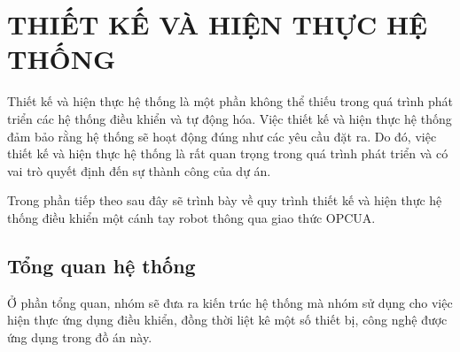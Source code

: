 \chapter{THIẾT KẾ VÀ HIỆN THỰC HỆ THỐNG}

Thiết kế và hiện thực hệ thống là một phần không thể thiếu trong quá trình phát triển các hệ thống điều khiển và tự động hóa. Việc thiết kế và hiện thực hệ thống đảm bảo rằng hệ thống sẽ hoạt động đúng như các yêu cầu đặt ra. Do đó, việc thiết kế và hiện thực hệ thống là rất quan trọng trong quá trình phát triển và có vai trò quyết định đến sự thành công của dự án.

Trong phần tiếp theo sau đây sẽ trình bày về quy trình thiết kế và hiện thực hệ thống điều khiển một cánh tay robot thông qua giao thức OPCUA.
\section{Tổng quan hệ thống}

Ở phần tổng quan, nhóm sẽ đưa ra kiến trúc hệ thống mà nhóm sử dụng cho việc hiện thực ứng dụng điều khiển, đồng thời liệt kê một số thiết bị, công nghệ được ứng dụng trong đồ án này.

